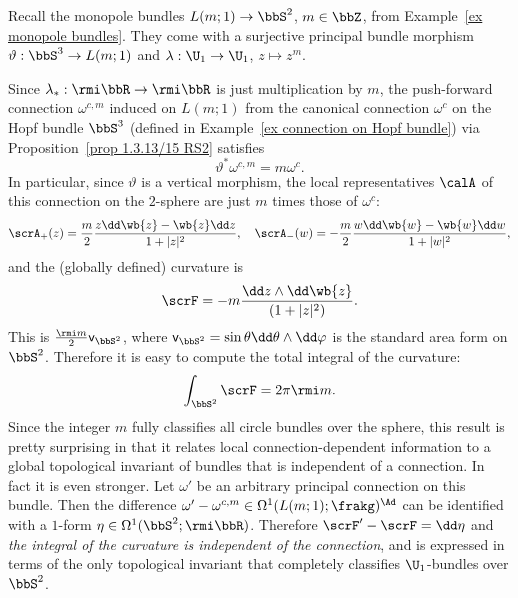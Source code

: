\begin{example}\label{ex connection on monopole bundles}
    Recall the monopole bundles $L(m;1)\to \bbS^2$, $m\in\bbZ$, from Example~\ref{ex monopole bundles}. They come with a surjective principal bundle morphism $\vartheta:\bbS^3\to L(m;1)$ and $\lambda:\U_1\to \U_1$, $z\mapsto z^m$. 
    
    Since $\lambda_\ast:\rmi \bbR\to\rmi\bbR$ is just multiplication by $m$, the push-forward connection $\omega^{c,m}$ induced on $L(m;1)$ from the canonical connection $\omega^c$ on the Hopf bundle $\bbS^3$ (defined in Example~\ref{ex connection on Hopf bundle}) via Proposition~\ref{prop 1.3.13/15 RS2} satisfies
    \[\vartheta^\ast \omega^{c,m}=m \omega^c.\]
    In particular, since $\vartheta$ is a vertical morphism, the local representatives $\calA$ of this connection on the $2$-sphere are just $m$ times those of $\omega^c$:
    \[\scrA_+(z)=\frac{m}{2}\frac{z \dd \wb{z}-\wb{z}\dd z}{1+|z|^2},\quad \scrA_-(w)=-\frac{m}{2}\frac{w \dd \wb{w}-\wb{w}\dd w}{1+|w|^2},\]
    and the (globally defined) curvature is
    \[\scrF=-m\frac{\dd z\wedge\dd \wb{z}}{(1+|z|^2)}.\]
    This is $\frac{\rmi m}{2}\mathsf{v}_{\bbS^2}$, where $\mathsf{v}_{\bbS^2}=\sin\theta\dd\theta\wedge\dd\varphi$ is the standard area form on $\bbS^2$. Therefore it is easy to compute the total integral of the curvature:
    \[\int_{\bbS^2} \scrF =2\pi \rmi m.\]
    Since the integer $m$ fully classifies all circle bundles over the sphere, this result is pretty surprising in that it relates local connection-dependent information to a global topological invariant of bundles that is independent of a connection. In fact it is even stronger. Let $\omega'$ be an arbitrary principal connection on this bundle. Then the difference $\omega'-\omega^{c,m}\in\Omega^1(L(m;1);\frakg)^\Ad$ can be identified with a $1$-form $\eta\in\Omega^1(\bbS^2;\rmi \bbR)$. Therefore $\scrF'-\scrF=\dd \eta$ and \emph{the integral of the curvature is independent of the connection}, and is expressed in terms of the only topological invariant that completely classifies $\U_1$-bundles over $\bbS^2$.
    

\end{example}
